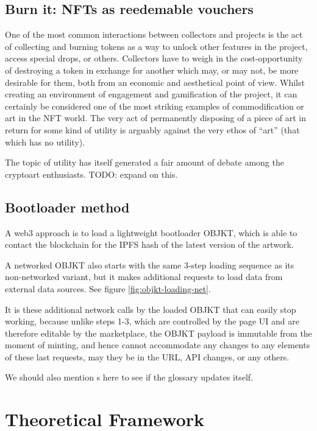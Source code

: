 \subsection{Burn it: NFTs as reedemable vouchers}

One of the most common interactions between collectors and projects is the act of collecting and burning tokens as a way to unlock other features in the project, access special drops, or others. Collectors have to weigh in the cost-opportunity of destroying a token in exchange for another which may, or may not, be more desirable for them, both from an economic and aesthetical point of view. Whilst creating an environment of engagement and gamification of the project, it can certainly be considered one of the most striking examples of commodification or art in the NFT world. The very act of permanently disposing of a piece of art in return for some kind of utility is arguably against the very ethos of ``art'' (that which has no utility).

The topic of utility has itself generated a fair amount of debate among the cryptoart enthusiasts. TODO: expand on this.

\subsection{Bootloader method}

A web3 approach is to load a lightweight bootloader OBJKT, which is able to contact the blockchain for the IPFS hash of the latest version of the artwork.



A networked OBJKT also starts with the same 3-step loading sequence as its non-networked variant, but it makes additional requests to load data from external data sources. See figure \ref{fig:objkt-loading-net}.



It is these additional network calls by the loaded OBJKT that can easily stop working, because unlike steps 1-3, which are controlled by the page UI and are therefore editable by the marketplace, the OBJKT payload is immutable from the moment of minting, and hence cannot accommodate any changes to any elements of these last requests, may they be in the URL, API changes, or any others.

We should also mention s here to see if the glossary updates itself.


\section{Theoretical Framework}

\todo




